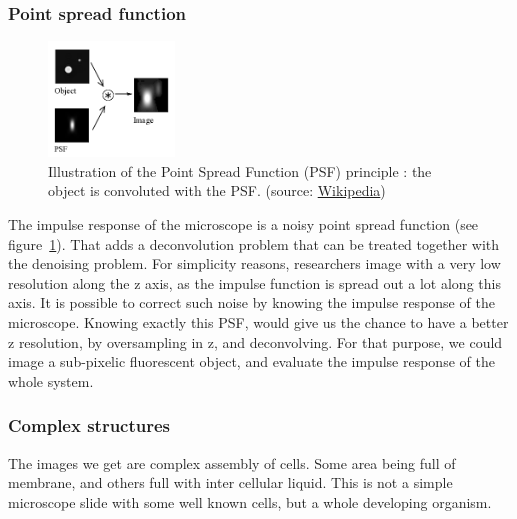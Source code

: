 \subsubsection{Point spread function}
\begin{figure}[htb]
\begin{center}
\leavevmode
\includegraphics[width=0.3\textwidth]{pictures/pointSpreadFunction}
\end{center}
\caption{Illustration of the Point Spread Function (PSF) principle : the object is convoluted with the PSF. (source: \href{http://en.wikipedia.org/wiki/File:Convolution_Illustrated_eng.png}{Wikipedia})}
\label{fig:pointSpreadPrinciple}
\end{figure}
The impulse response of the microscope is a noisy point spread function (see figure~\ref{fig:pointSpreadPrinciple}).
That adds a deconvolution problem that can be treated together with the denoising problem.
For simplicity reasons, researchers image with a very low resolution along the z axis, as the impulse function is spread out a lot along this axis.
It is possible to correct such noise by knowing the impulse response of the microscope.
Knowing exactly this PSF, would give us the chance to have a better z resolution, by oversampling in z, and deconvolving.
For that purpose, we could image a sub-pixelic fluorescent object, and evaluate the impulse response of the whole system.




\subsubsection{Complex structures}

The images we get are complex assembly of cells.
Some area being full of membrane, and others full with inter cellular liquid.
This is not a simple microscope slide with some well known cells, but a whole developing organism.




\clearpage

